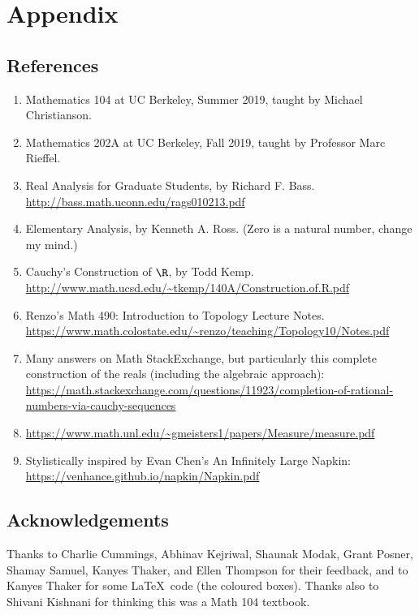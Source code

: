 \documentclass[./analysis.tex]{subfiles}
\begin{document}
    \section{Appendix}
    \subsection*{References}
    \begin{enumerate}
        \item Mathematics 104 at UC Berkeley, Summer 2019, taught by Michael Christianson.
        \item Mathematics 202A at UC Berkeley, Fall 2019, taught by Professor Marc Rieffel.
        \item Real Analysis for Graduate Students, by Richard F. Bass. \url{http://bass.math.uconn.edu/rags010213.pdf}
        \item Elementary Analysis, by Kenneth A. Ross. (Zero is a natural number, change my mind.)
        \item Cauchy's Construction of $\R$, by Todd Kemp. \url{http://www.math.ucsd.edu/~tkemp/140A/Construction.of.R.pdf}
        \item Renzo's Math 490: Introduction to Topology Lecture Notes. \url{https://www.math.colostate.edu/~renzo/teaching/Topology10/Notes.pdf}
        \item Many answers on Math StackExchange, but particularly this complete construction of the reals (including the algebraic approach): \url{https://math.stackexchange.com/questions/11923/completion-of-rational-numbers-via-cauchy-sequences}
        \item \url{https://www.math.unl.edu/~gmeisters1/papers/Measure/measure.pdf}
        \item Stylistically inspired by Evan Chen's An Infinitely Large Napkin: \url{https://venhance.github.io/napkin/Napkin.pdf}
    \end{enumerate}

    \subsection*{Acknowledgements}

    Thanks to Charlie Cummings, Abhinav Kejriwal, Shaunak Modak, Grant Posner, Shamay Samuel, Kanyes Thaker, and Ellen Thompson for their feedback, and to Kanyes Thaker for some \LaTeX \ code (the coloured boxes). Thanks also to Shivani Kishnani for thinking this was a Math 104 textbook.
\end{document}
